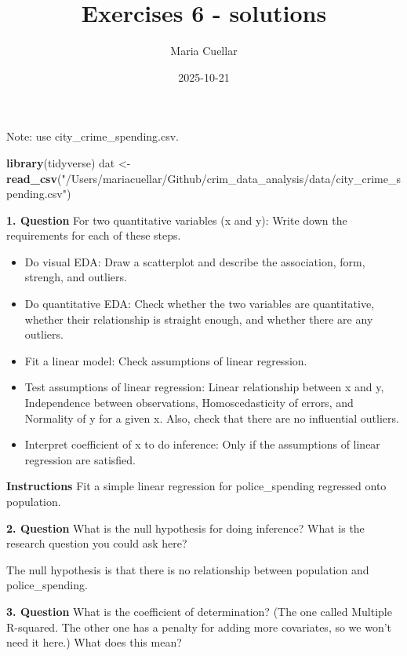 \documentclass[
]{article}
\title{Exercises 6 - solutions}
\author{Maria Cuellar}
\date{2025-10-21}
\newenvironment{Shaded}{\begin{snugshade}}{\end{snugshade}}
\newcommand{\FunctionTok}[1]{\textcolor[rgb]{0.13,0.29,0.53}{\textbf{#1}}}
\newcommand{\NormalTok}[1]{#1}
\newcommand{\OtherTok}[1]{\textcolor[rgb]{0.56,0.35,0.01}{#1}}
\newcommand{\StringTok}[1]{\textcolor[rgb]{0.31,0.60,0.02}{#1}}
\providecommand{\tightlist}{%
  \setlength{\itemsep}{0pt}\setlength{\parskip}{0pt}}
\begin{document}
\maketitle

Note: use city\_crime\_spending.csv.

\begin{Shaded}
\begin{Highlighting}[]
\FunctionTok{library}\NormalTok{(tidyverse)}
\NormalTok{dat }\OtherTok{\textless{}{-}} \FunctionTok{read\_csv}\NormalTok{(}\StringTok{"/Users/mariacuellar/Github/crim\_data\_analysis/data/city\_crime\_spending.csv"}\NormalTok{)}
\end{Highlighting}
\end{Shaded}

\textbf{1. Question} For two quantitative variables (x and y): Write
down the requirements for each of these steps.

\begin{itemize}
\tightlist
\item
  Do visual EDA: Draw a scatterplot and describe the association, form,
  strengh, and outliers.
\item
  Do quantitative EDA: Check whether the two variables are quantitative,
  whether their relationship is straight enough, and whether there are
  any outliers.
\item
  Fit a linear model: Check assumptions of linear regression.
\item
  Test assumptions of linear regression: Linear relationship between x
  and y, Independence between observations, Homoscedasticity of errors,
  and Normality of y for a given x. Also, check that there are no
  influential outliers.
\item
  Interpret coefficient of x to do inference: Only if the assumptions of
  linear regression are satisfied.
\end{itemize}

\textbf{Instructions} Fit a simple linear regression for
police\_spending regressed onto population.

\textbf{2. Question} What is the null hypothesis for doing inference?
What is the research question you could ask here?

The null hypothesis is that there is no relationship between population
and police\_spending.

\textbf{3. Question} What is the coefficient of determination? (The one
called Multiple R-squared. The other one has a penalty for adding more
covariates, so we won't need it here.) What does this mean?
\end{document}
